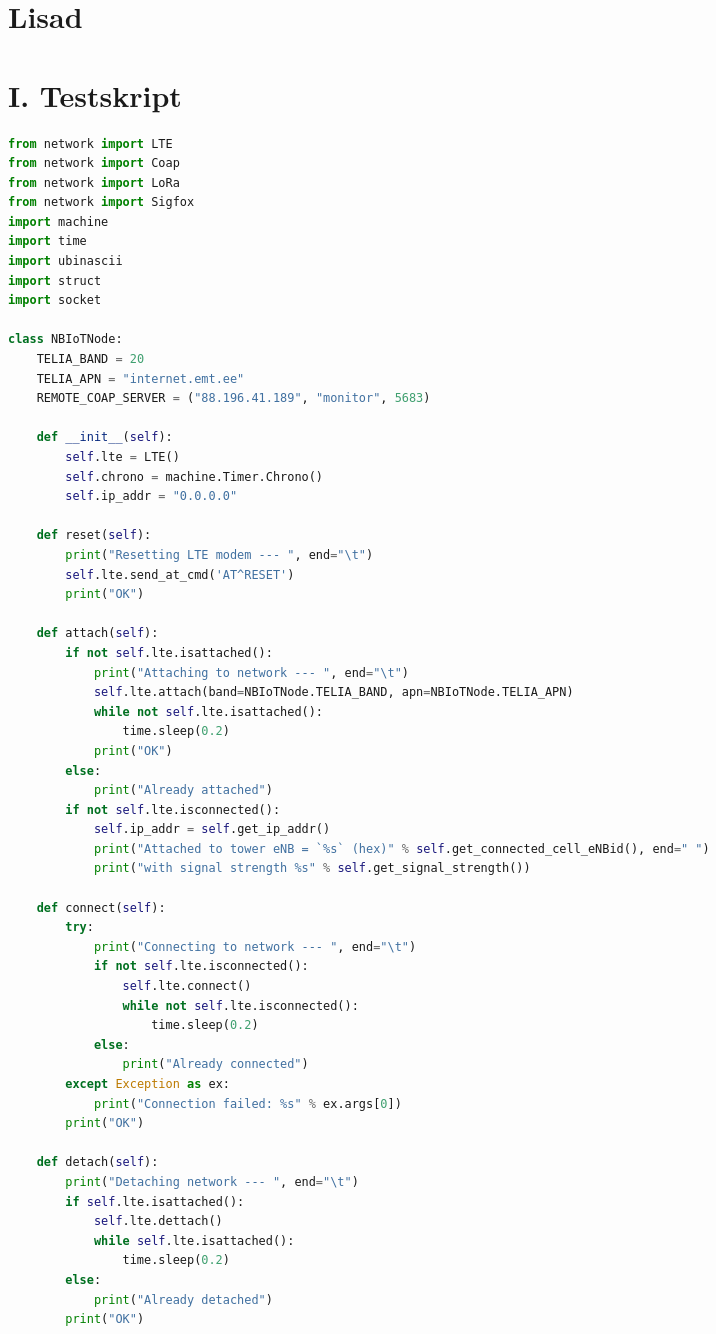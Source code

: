 \documentclass[12pt]{article}
\begin{document}
    \section*{Lisad}


    \section*{I. Testskript}
    \begin{spacing}{0.8}
        \begin{lstlisting}[language=Python]
from network import LTE
from network import Coap
from network import LoRa
from network import Sigfox
import machine
import time
import ubinascii
import struct
import socket

class NBIoTNode:
    TELIA_BAND = 20
    TELIA_APN = "internet.emt.ee"
    REMOTE_COAP_SERVER = ("88.196.41.189", "monitor", 5683)

    def __init__(self):
        self.lte = LTE()
        self.chrono = machine.Timer.Chrono()
        self.ip_addr = "0.0.0.0"

    def reset(self):
        print("Resetting LTE modem --- ", end="\t")
        self.lte.send_at_cmd('AT^RESET')
        print("OK")

    def attach(self):
        if not self.lte.isattached():
            print("Attaching to network --- ", end="\t")
            self.lte.attach(band=NBIoTNode.TELIA_BAND, apn=NBIoTNode.TELIA_APN)
            while not self.lte.isattached():
                time.sleep(0.2)
            print("OK")
        else:
            print("Already attached")
        if not self.lte.isconnected():
            self.ip_addr = self.get_ip_addr()
            print("Attached to tower eNB = `%s` (hex)" % self.get_connected_cell_eNBid(), end=" ")
            print("with signal strength %s" % self.get_signal_strength())

    def connect(self):
        try:
            print("Connecting to network --- ", end="\t")
            if not self.lte.isconnected():
                self.lte.connect()
                while not self.lte.isconnected():
                    time.sleep(0.2)
            else:
                print("Already connected")
        except Exception as ex:
            print("Connection failed: %s" % ex.args[0])
        print("OK")

    def detach(self):
        print("Detaching network --- ", end="\t")
        if self.lte.isattached():
            self.lte.dettach()
            while self.lte.isattached():
                time.sleep(0.2)
        else:
            print("Already detached")
        print("OK")


\end{lstlisting}
\end{spacing}
\end{document}
